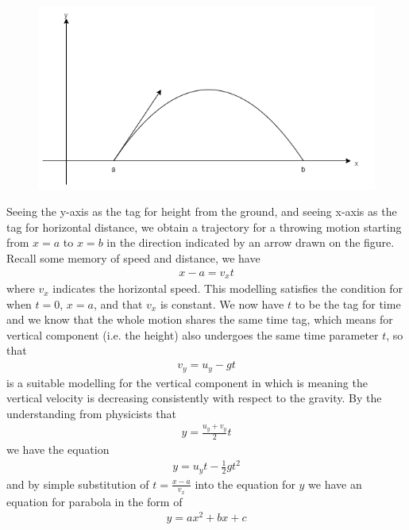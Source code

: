 \documentclass[12pt]{article}
\begin{document}
    \begin{figure}[H]
        \centering
        \includegraphics[scale=0.8]{parabola.png}
    \end{figure}

    Seeing the y-axis as the tag for height from the ground, and seeing x-axis as the tag for horizontal distance, we obtain a trajectory for a throwing motion starting from $x=a$ to $x=b$ in the direction indicated by an arrow drawn on the figure. Recall some memory of speed and distance, we have \begin{align*}
        x-a=v_x t
    \end{align*}where $v_x$ indicates the horizontal speed. This modelling satisfies the condition for when $t=0$, $x=a$, and that $v_x$ is constant. We now have $t$ to be the tag for time and we know that the whole motion shares the same time tag, which means for vertical component (i.e. the height) also undergoes the same time parameter $t$, so that \begin{align*}
        v_y=u_y-gt
    \end{align*}
    is a suitable modelling for the vertical component in which is meaning the vertical velocity is decreasing consistently with respect to the gravity. By the understanding from physicists that \begin{align*}
        y=\frac{u_y+v_y}{2}t
    \end{align*} we have the equation \begin{align*}
        y=u_y t-\frac{1}{2}gt^2
    \end{align*} and by simple substitution of $t=\frac{x-a}{v_x}$ into the equation for $y$ we have an equation for parabola in the form of \begin{align*}
        y=ax^2+bx+c
    \end{align*}
\end{document}
